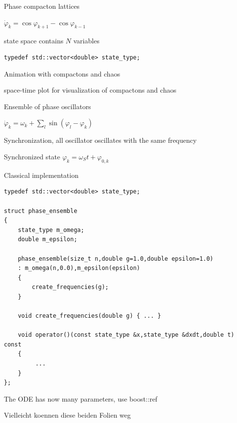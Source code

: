 \begin{frame}[fragile]
 
 Phase compacton lattices

 $\dot{\varphi}_k = \cos \varphi_{k+1} - \cos \varphi_{k-1}$

 state space contains $N$ variables

 \begin{lstlisting}
typedef std::vector<double> state_type;
 \end{lstlisting}

 Animation with compactons and chaos

 space-time plot for visualization of compactons and chaos

\end{frame}





\begin{frame}[fragile]

Ensemble of phase oscillators

$\dot{\varphi}_k = \omega_k + \sum\limits_l \sin( \varphi_l - \varphi_k )$

Synchronization, all oscillator oscillates with the same frequency

Synchronized state $\varphi_k = \omega_S t + \varphi_{0,k} $

\end{frame}



\begin{frame}[fragile]

Classical implementation

\begin{lstlisting}
typedef std::vector<double> state_type;

struct phase_ensemble
{
    state_type m_omega;
    double m_epsilon;

    phase_ensemble(size_t n,double g=1.0,double epsilon=1.0)
    : m_omega(n,0.0),m_epsilon(epsilon)
    {
        create_frequencies(g);
    }

    void create_frequencies(double g) { ... }

    void operator()(const state_type &x,state_type &dxdt,double t) const
    {
         ...
    }
};
\end{lstlisting}

The ODE has now many parameters, use boost::ref

Vielleicht koennen diese beiden Folien weg

\end{frame}




